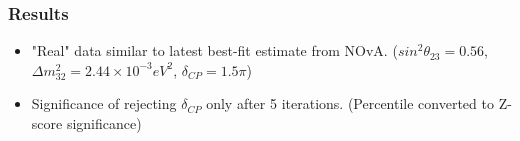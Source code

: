 \documentclass[9pt, aspectratio=169]{beamer}
\begin{document}
\begin{frame}
  \frametitle{Results}
  \begin{itemize}
    \item "Real" data similar to latest best-fit estimate from NOvA. ($sin^{2}\theta_{23} = 0.56$, $\Delta m^2_{32} = 2.44\times10^{-3} eV^{2}$, $\delta_{CP} = 1.5\pi$)
    \item Significance of rejecting $\delta_{CP}$ only after 5 iterations. (Percentile converted to Z-score significance) 
  \end{itemize}
  \begin{columns}
  \end{columns}
\end{frame}
\end{document}
